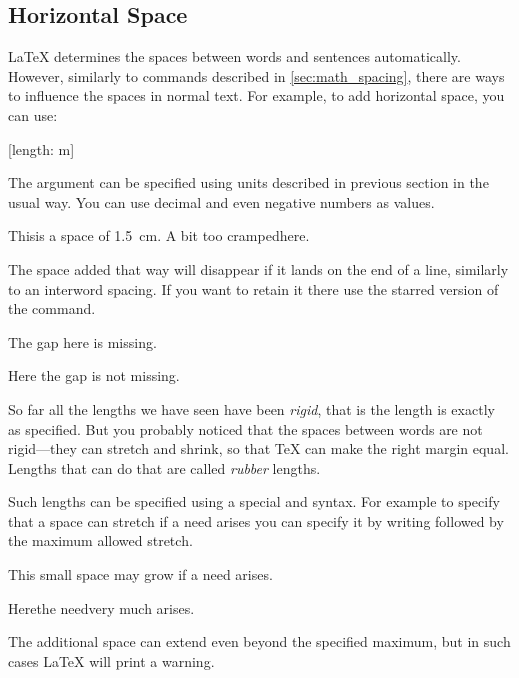 \subsection{Horizontal Space}\label{sec:hspace}

\LaTeX{} determines the spaces between words and sentences automatically.
However, similarly to commands described in \autoref{sec:math_spacing}, there are
ways to influence the spaces in normal text. For example, to add horizontal
space, you can use:
\begin{lscommand}
  [length: m]
\end{lscommand}
The  argument can be specified using units described in previous
section in the usual way. You can use decimal and even negative numbers as
values.
\begin{example}
This\hspace{1.5cm}is a space
of \qty{1.5}{\cm}. A bit too
cramped\hspace{-5pt}here.
\end{example}
The space added that way will disappear if it lands on the end of a line,
similarly to an interword spacing. If you want to retain it there use the
starred version of the command.
\begin{example}
The gap here is\hspace{1cm}%
\linebreak missing.

Here the gap is\hspace*{1cm}%
\linebreak not missing.
\end{example}

So far all the lengths we have seen have been \emph{rigid}, that is the length is exactly as specified. But
you probably noticed that the spaces between words are not rigid---they can
stretch and shrink, so that \TeX{} can make the right margin equal. Lengths
that can do that are called \emph{rubber} lengths.

Such lengths can be specified using a special  and 
syntax. For example to specify that a space can stretch if a need arises you
can specify it by writing  followed by the maximum allowed stretch.
\begin{example}
This small\hspace{1em plus 2cm}%
space may grow if a need arises.

Here\hspace{1em plus 2cm}the
need\linebreak very much arises.
\end{example}
The additional space can extend even beyond the specified maximum, but in such
cases \LaTeX{} will print a warning.


